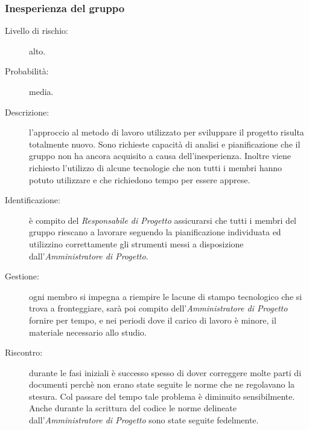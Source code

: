 \subsubsection{Inesperienza del gruppo}
\begin{description}
	\item[Livello di rischio:] alto.
	\item[Probabilità:] media.
	\item[Descrizione:] l'approccio al metodo di lavoro utilizzato per sviluppare il progetto risulta totalmente nuovo. Sono richieste capacità di analisi	e pianificazione che il gruppo non ha ancora acquisito a causa dell'inesperienza. Inoltre viene richiesto l'utilizzo di alcune tecnologie che non tutti i membri hanno potuto utilizzare e che richiedono tempo per essere apprese.
	\item[Identificazione:] è compito del \textit{Responsabile di Progetto} assicurarsi che tutti i membri del gruppo riescano a lavorare seguendo la pianificazione individuata ed utilizzino correttamente gli strumenti messi a disposizione dall'\textit{Amministratore di Progetto}.
	\item[Gestione:] ogni membro si impegna a riempire le lacune di stampo tecnologico che si trova a fronteggiare, sarà poi compito dell'\textit{Amministratore di Progetto} fornire per tempo, e nei periodi dove il carico di lavoro è minore, il materiale necessario allo studio.
	\item[Riscontro:] durante le fasi iniziali è successo spesso di dover correggere molte parti di documenti perchè non erano state seguite le norme che ne regolavano la stesura. Col passare del tempo tale problema è diminuito sensibilmente. Anche durante la scrittura del codice le norme delineate dall'\textit{Amministratore di Progetto} sono state seguite fedelmente.
\end{description}

